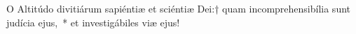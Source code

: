 
\lettrine{O}{} Altitúdo divitiárum sapiéntiæ et sciéntiæ Dei:† quam incomprehensibília sunt judícia ejus,~* et investigábiles viæ ejus!
